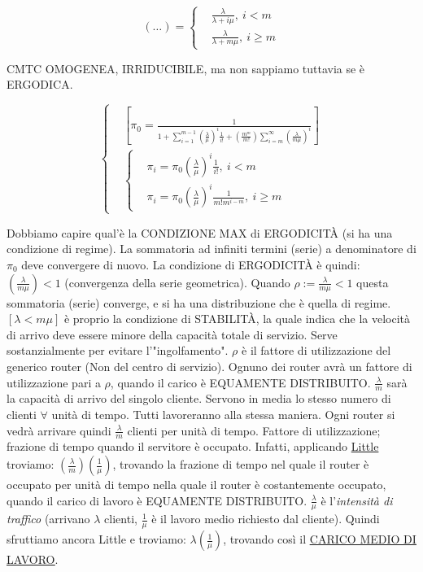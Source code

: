 \[
	(\dots) = \left\{
	\begin{aligned}
	&\frac{\lambda}{\lambda+i\mu},\ i<m\\
	&\frac{\lambda}{\lambda+m\mu},\ i\geq m
	\end{aligned}
	\right.
\]

CMTC OMOGENEA, IRRIDUCIBILE, ma non sappiamo tuttavia se è ERGODICA.

\[
	\left\{
	\begin{aligned}
	&[\pi_0 = \frac{1}{1+\sum_{i=1}^{m-1}{(\frac{\lambda}{\mu})^i\frac{1}{i!}} + (\frac{m^m}{m!})\sum_{i=m}^\infty{(\frac{\lambda}{m\mu})^i}}]\\
	&\left\{
	\begin{aligned}
	&\pi_i = \pi_0 (\frac{\lambda}{\mu})^i \frac{1}{i!},\ i<m\\
	&\pi_i = \pi_0 (\frac{\lambda}{\mu})^i \frac{1}{m!m^{i-m}},\ i\geq m
	\end{aligned}
	\right.
	\end{aligned}
	\right.
\]

Dobbiamo capire qual'è la CONDIZIONE MAX di ERGODICIT\`A (si ha una condizione di regime). La sommatoria ad infiniti termini (serie) a denominatore di $\pi_0$ deve convergere di nuovo. La condizione di ERGODICIT\`A è quindi: $(\frac{\lambda}{m\mu}) < 1$ (convergenza della serie geometrica). Quando $\rho := \frac{\lambda}{m\mu} < 1$ questa sommatoria (serie) converge, e si ha una distribuzione che è quella di regime. $[\lambda < m\mu]$ è proprio la condizione di STABILIT\`A, la quale indica che la velocità di arrivo deve essere minore della capacità totale di servizio. Serve sostanzialmente per evitare l'"ingolfamento". $\rho$ è il fattore di utilizzazione del generico router (Non del centro di servizio). Ognuno dei router avrà un fattore di utilizzazione pari a $\rho$, quando il carico è EQUAMENTE DISTRIBUITO. $\frac{\lambda}{m}$ sarà la capacità di arrivo del singolo cliente. Servono in media lo stesso numero di clienti $\forall$ unità di tempo. Tutti lavoreranno alla stessa maniera. Ogni router si vedrà arrivare quindi $\frac{\lambda}{m}$ clienti per unità di tempo. Fattore di utilizzazione; frazione di tempo quando il servitore è occupato. Infatti, applicando \underline{Little} troviamo: $(\frac{\lambda}{m})(\frac{1}{\mu})$, trovando la frazione di tempo nel quale il router è occupato per unità di tempo nella quale il router è costantemente occupato, quando il carico di lavoro è EQUAMENTE DISTRIBUITO. $\frac{\lambda}{\mu}$ è l'\textit{intensità di traffico} (arrivano $\lambda$ clienti, $\frac{1}{\mu}$ è il lavoro medio richiesto dal cliente). Quindi sfruttiamo ancora Little e troviamo: $\lambda(\frac{1}{\mu})$, trovando così il \underline{\underline{CARICO MEDIO DI LAVORO}}. 

